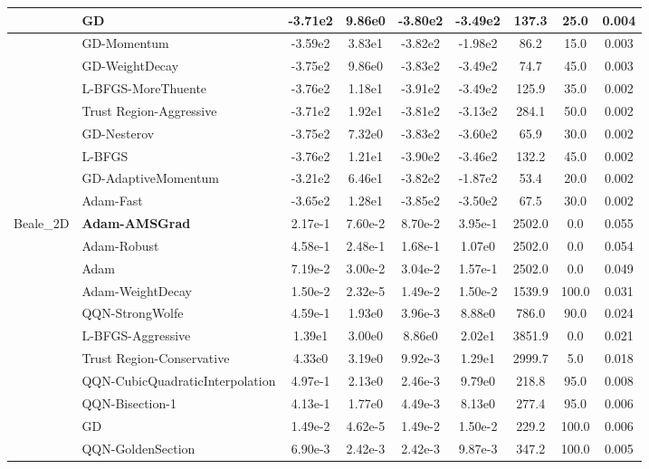 \documentclass[10pt]{article}
\begin{document}
\begin{longtable}{|l|l|c|c|c|c|c|c|c|}
\hline
 & GD & -3.71e2 & 9.86e0 & -3.80e2 & -3.49e2 & 137.3 & 25.0 & 0.004 \\
\hline
 & GD-Momentum & -3.59e2 & 3.83e1 & -3.82e2 & -1.98e2 & 86.2 & 15.0 & 0.003 \\
\hline
 & GD-WeightDecay & -3.75e2 & 9.86e0 & -3.83e2 & -3.49e2 & 74.7 & 45.0 & 0.003 \\
\hline
 & L-BFGS-MoreThuente & -3.76e2 & 1.18e1 & -3.91e2 & -3.49e2 & 125.9 & 35.0 & 0.002 \\
\hline
 & Trust Region-Aggressive & -3.71e2 & 1.92e1 & -3.81e2 & -3.13e2 & 284.1 & 50.0 & 0.002 \\
\hline
 & GD-Nesterov & -3.75e2 & 7.32e0 & -3.83e2 & -3.60e2 & 65.9 & 30.0 & 0.002 \\
\hline
 & L-BFGS & -3.76e2 & 1.21e1 & -3.90e2 & -3.46e2 & 132.2 & 45.0 & 0.002 \\
\hline
 & GD-AdaptiveMomentum & -3.21e2 & 6.46e1 & -3.82e2 & -1.87e2 & 53.4 & 20.0 & 0.002 \\
\hline
 & Adam-Fast & -3.65e2 & 1.28e1 & -3.85e2 & -3.50e2 & 67.5 & 30.0 & 0.002 \\
Beale\_2D & \textbf{Adam-AMSGrad} & 2.17e-1 & 7.60e-2 & 8.70e-2 & 3.95e-1 & 2502.0 & 0.0 & 0.055 \\
\hline
 & Adam-Robust & 4.58e-1 & 2.48e-1 & 1.68e-1 & 1.07e0 & 2502.0 & 0.0 & 0.054 \\
\hline
 & Adam & 7.19e-2 & 3.00e-2 & 3.04e-2 & 1.57e-1 & 2502.0 & 0.0 & 0.049 \\
\hline
 & Adam-WeightDecay & 1.50e-2 & 2.32e-5 & 1.49e-2 & 1.50e-2 & 1539.9 & 100.0 & 0.031 \\
\hline
 & QQN-StrongWolfe & 4.59e-1 & 1.93e0 & 3.96e-3 & 8.88e0 & 786.0 & 90.0 & 0.024 \\
\hline
 & L-BFGS-Aggressive & 1.39e1 & 3.00e0 & 8.86e0 & 2.02e1 & 3851.9 & 0.0 & 0.021 \\
\hline
 & Trust Region-Conservative & 4.33e0 & 3.19e0 & 9.92e-3 & 1.29e1 & 2999.7 & 5.0 & 0.018 \\
\hline
 & QQN-CubicQuadraticInterpolation & 4.97e-1 & 2.13e0 & 2.46e-3 & 9.79e0 & 218.8 & 95.0 & 0.008 \\
\hline
 & QQN-Bisection-1 & 4.13e-1 & 1.77e0 & 4.49e-3 & 8.13e0 & 277.4 & 95.0 & 0.006 \\
\hline
 & GD & 1.49e-2 & 4.62e-5 & 1.49e-2 & 1.50e-2 & 229.2 & 100.0 & 0.006 \\
\hline
 & QQN-GoldenSection & 6.90e-3 & 2.42e-3 & 2.42e-3 & 9.87e-3 & 347.2 & 100.0 & 0.005 \\

\end{longtable}
\end{document}
